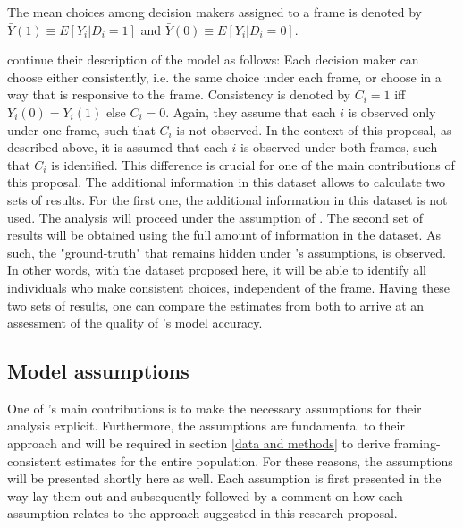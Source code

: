 The mean choices among decision makers assigned to a frame is denoted by 
$ \bar{Y}(1) \equiv E[Y_i | D_i = 1]  $ and $ \bar{Y}(0) \equiv E[Y_i | D_i = 0]  $.

\textcite{goldin2020} continue their description of the model as follows: Each
decision maker can choose either consistently, i.e. the same choice under each frame,
or choose in a way that is responsive to the frame. Consistency is denoted by $ C_i = 1 $ iff $Y_i(0) = Y_i(1) $ else $C_i = 0 $.
Again, they assume that each $ i $ is observed only under one frame, such that $C_i$ is not observed.
In the context of this proposal, as described above, it is assumed that each $ i $ is observed under both frames, such that
$ C_i $ is identified. This difference is crucial for one of the main contributions of this proposal.
The additional information in this dataset allows to calculate two sets of results. For the first one, the additional information in this dataset is not used.
The analysis will proceed under the assumption of \textcite{goldin2020}. The second set of results will be obtained using the full amount of information
in the dataset. As such, the "ground-truth" that remains hidden under \textcite{goldin2020}'s assumptions, is observed. In other words, with the dataset proposed 
here, it will be able to identify all individuals who make consistent choices, independent of the frame. 
Having these two sets of results, one can compare the estimates from both to arrive at an assessment of the quality of \textcite{goldin2020}'s model accuracy.


\subsection{Model assumptions}

One of \textcite{goldin2020}'s main contributions is to make the necessary assumptions for their analysis explicit.
Furthermore, the assumptions are fundamental to their approach and will be required in section \ref{data and methods} to
derive framing-consistent estimates for the entire population.
For these reasons, the assumptions will be presented shortly here as well.
Each assumption is first presented in the way \textcite{goldin2020} lay them out and subsequently
followed by a comment on how each assumption relates to the approach suggested in this research proposal.

